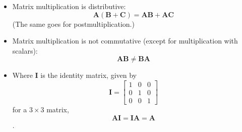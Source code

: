 \documentclass[12pt, letterpaper]{article}
\begin{document}
\begin{itemize}
\item Matrix multiplication is distributive:
\begin{equation*}
\mathbf{A}\left(\mathbf{B}+\mathbf{C}\right) = \mathbf{A}\mathbf{B} + \mathbf{A}\mathbf{C} 
\end{equation*}
(The same goes for postmultiplication.)

\item Matrix multiplication is not commutative (except for multiplication with scalars):
\begin{equation*}
\mathbf{A}\mathbf{B} \neq \mathbf{B}\mathbf{A}
\end{equation*}

\item Where $\mathbf{I}$ is the identity matrix, given by
\begin{equation*}
\mathbf{I} = \left[
\begin{array}{ccc}
1 & 0 & 0 \\
0& 1 & 0 \\
0 & 0 & 1
\end{array} \right]
\end{equation*}
for a $3\times 3$ matrix, 
\begin{equation*}
\mathbf{A}\mathbf{I} = \mathbf{I}\mathbf{A} = \mathbf{A}
\end{equation*}.
\end{itemize}
\end{document}
